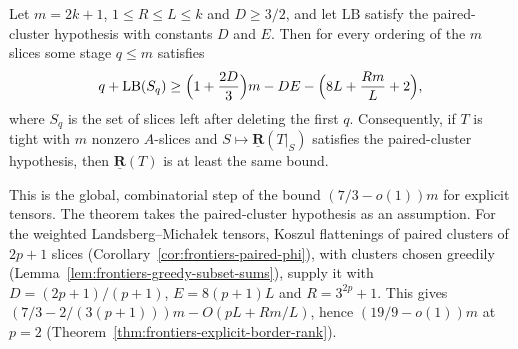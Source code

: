 \begin{theorem}
  \label{thm:frontiers-deletion-game}
  \leanok
  Let $m = 2k + 1$, $1 \le R \le L \le k$ and $D \ge 3/2$, and let $\mathrm{LB}$ satisfy
  the paired-cluster hypothesis with constants $D$ and $E$. Then for every ordering of the
  $m$ slices some stage $q \le m$ satisfies
  \[
    q + \mathrm{LB}(S_q) \ge \Bigl(1 + \frac{2D}{3}\Bigr) m - DE
      - \Bigl(8L + \frac{Rm}{L} + 2\Bigr),
  \]
  where $S_q$ is the set of slices left after deleting the first $q$. Consequently, if $T$
  is tight with $m$ nonzero $A$-slices and $S \mapsto \underline{\mathbf{R}}(T|_S)$
  satisfies the paired-cluster hypothesis, then $\underline{\mathbf{R}}(T)$ is at least the
  same bound.

  This is the global, combinatorial step of the bound $(7/3 - o(1))m$ for explicit tensors.
  The theorem takes the paired-cluster hypothesis as an assumption. For the weighted
  Landsberg--Micha{\l}ek tensors, Koszul flattenings of paired clusters of $2p + 1$ slices
  (Corollary~\ref{cor:frontiers-paired-phi}), with clusters chosen greedily
  (Lemma~\ref{lem:frontiers-greedy-subset-sums}), supply it with $D = (2p + 1)/(p + 1)$,
  $E = 8(p + 1)L$ and $R = 3^{2p} + 1$. This gives
  $(7/3 - 2/(3(p + 1)))m - O(pL + Rm/L)$, hence $(19/9 - o(1))m$ at $p = 2$
  (Theorem~\ref{thm:frontiers-explicit-border-rank}).
\end{theorem}
